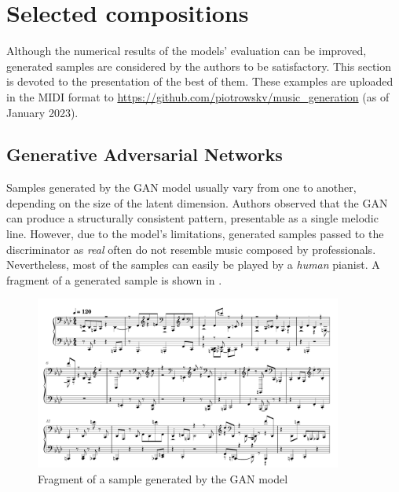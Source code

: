 \documentclass[a4paper, 11pt, twoside]{report}
\theoremstyle{definition}
\begin{document}
\section{Selected compositions}

Although the numerical results of the models' evaluation can be improved, generated samples are considered by the authors to be satisfactory. This section is devoted to the presentation of the best of them. These examples are uploaded in the MIDI format to \url{https://github.com/piotrowskv/music\_generation} (as of January 2023). \par

\subsection{Generative Adversarial Networks}

Samples generated by the GAN model usually vary from one to another, depending on the size of the latent dimension. Authors observed that the GAN can produce a structurally consistent pattern, presentable as a single melodic line. However, due to the model's limitations, generated samples passed to the discriminator as \textit{real} often do not resemble music composed by professionals. Nevertheless, most of the samples can easily be played by a \textit{human} pianist. A fragment of a generated sample is shown in . \par

\begin{figure}[H]
    \begin{center}
        \includegraphics[width=0.9\textwidth]{gan_sample.png}
        \caption{Fragment of a sample generated by the GAN model}
        \label{fig:gan-sample}
    \end{center}
\end{figure}
\end{document}
